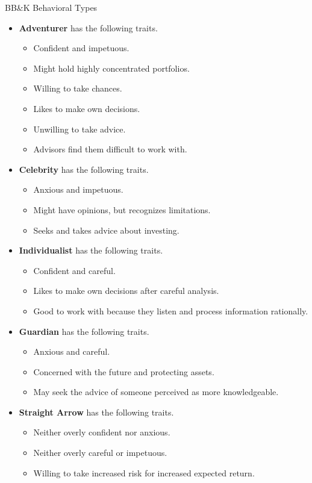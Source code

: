\documentclass[../custom]{flashcards}
\newcommand{\studyArea}{Behavioral Finance}
\begin{document}
\begin{flashcard}[\studyArea]{BB\&K Behavioral Types}
    \begin{itemize}[nosep]
        \item \textbf{Adventurer} has the following traits.
            \begin{itemize}[nosep]
                \item Confident and impetuous.
                \item Might hold highly concentrated portfolios.
                \item Willing to take chances.
                \item Likes to make own decisions.
                \item Unwilling to take advice.
                \item Advisors find them difficult to work with.
            \end{itemize}
        \item \textbf{Celebrity} has the following traits.
            \begin{itemize}[nosep]
                \item Anxious and impetuous.
                \item Might have opinions, but recognizes limitations.
                \item Seeks and takes advice about investing.
            \end{itemize}
        \item \textbf{Individualist} has the following traits.
            \begin{itemize}[nosep]
                \item Confident and careful.
                \item Likes to make own decisions after careful analysis.
                \item Good to work with because they listen and process information rationally.
            \end{itemize}
        \item \textbf{Guardian} has the following traits.
            \begin{itemize}[nosep]
                \item Anxious and careful.
                \item Concerned with the future and protecting assets.
                \item May seek the advice of someone perceived as more knowledgeable.
            \end{itemize}
        \item \textbf{Straight Arrow} has the following traits.
            \begin{itemize}[nosep]
                \item Neither overly confident nor anxious.
                \item Neither overly careful or impetuous.
                \item Willing to take increased risk for increased expected return.
            \end{itemize}
    \end{itemize}
\end{flashcard}
\end{document}
